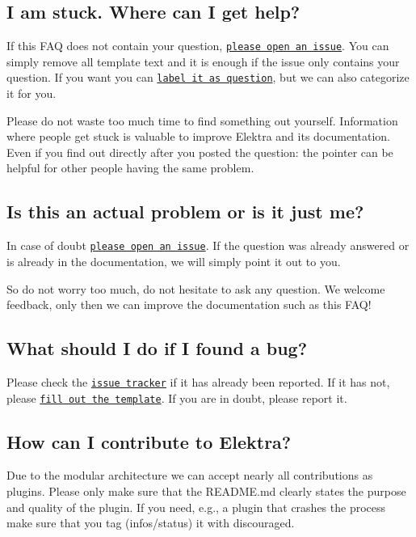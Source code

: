 \subsection*{I am stuck. Where can I get help?}

If this F\+A\+Q does not contain your question, \href{http://git.libelektra.org/issues}{\tt please open an issue}. You can simply remove all template text and it is enough if the issue only contains your question. If you want you can \href{http://git.libelektra.org/issues/labels/question}{\tt label it as question}, but we can also categorize it for you.

Please do not waste too much time to find something out yourself. Information where people get stuck is valuable to improve Elektra and its documentation. Even if you find out directly after you posted the question\+: the pointer can be helpful for other people having the same problem.

\subsection*{Is this an actual problem or is it just me?}

In case of doubt \href{http://git.libelektra.org/issues}{\tt please open an issue}. If the question was already answered or is already in the documentation, we will simply point it out to you.

So do not worry too much, do not hesitate to ask any question. We welcome feedback, only then we can improve the documentation such as this F\+A\+Q!

\subsection*{What should I do if I found a bug?}

Please check the \href{http://git.libelektra.org/issues}{\tt issue tracker} if it has already been reported. If it has not, please \href{http://git.libelektra.org/issues/new}{\tt fill out the template}. If you are in doubt, please report it.

\subsection*{How can I contribute to Elektra?}

Due to the modular architecture we can accept nearly all contributions as plugins. Please only make sure that the R\+E\+A\+D\+M\+E.\+md clearly states the purpose and quality of the plugin. If you need, e.\+g., a plugin that crashes the process make sure that you tag ({\ttfamily infos/status}) it with {\ttfamily discouraged}.

